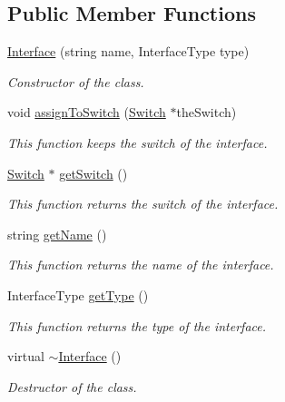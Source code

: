 \subsection*{\-Public \-Member \-Functions}
\begin{DoxyCompactItemize}
\item 
\hyperlink{classInterface_a09d0b18dfc3df8d2cc5c583e37feb768}{\-Interface} (string name, \-Interface\-Type type)
\begin{DoxyCompactList}\small\item\em \-Constructor of the class. \end{DoxyCompactList}\item 
void \hyperlink{classInterface_ae481c6d71a609b1afa4638c9197b3474}{assign\-To\-Switch} (\hyperlink{classSwitch}{\-Switch} $\ast$the\-Switch)
\begin{DoxyCompactList}\small\item\em \-This function keeps the switch of the interface. \end{DoxyCompactList}\item 
\hyperlink{classSwitch}{\-Switch} $\ast$ \hyperlink{classInterface_afee5e62b6ae6c8ac964dd581c56f40c7}{get\-Switch} ()
\begin{DoxyCompactList}\small\item\em \-This function returns the switch of the interface. \end{DoxyCompactList}\item 
\hypertarget{classInterface_a05a561691dff3eba1241e18429a63d96}{string \hyperlink{classInterface_a05a561691dff3eba1241e18429a63d96}{get\-Name} ()}\label{classInterface_a05a561691dff3eba1241e18429a63d96}

\begin{DoxyCompactList}\small\item\em \-This function returns the name of the interface. \end{DoxyCompactList}\item 
\hypertarget{classInterface_a053cd0afc11266026baabd6c1a99550a}{\-Interface\-Type \hyperlink{classInterface_a053cd0afc11266026baabd6c1a99550a}{get\-Type} ()}\label{classInterface_a053cd0afc11266026baabd6c1a99550a}

\begin{DoxyCompactList}\small\item\em \-This function returns the type of the interface. \end{DoxyCompactList}\item 
\hypertarget{classInterface_a19179888f29f18f1be54a3dfe98f68c0}{virtual \hyperlink{classInterface_a19179888f29f18f1be54a3dfe98f68c0}{$\sim$\-Interface} ()}\label{classInterface_a19179888f29f18f1be54a3dfe98f68c0}

\begin{DoxyCompactList}\small\item\em \-Destructor of the class. \end{DoxyCompactList}\end{DoxyCompactItemize}
